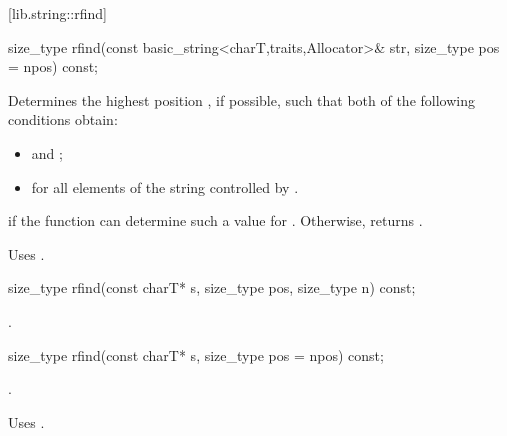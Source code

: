 [lib.string::rfind]{}

%
%
\begin{itemdecl}
size_type rfind(const basic_string<charT,traits,Allocator>& str,
                size_type pos = npos) const;
\end{itemdecl}

\begin{itemdescr}
\pnum
\effects
Determines the highest position , if possible, such that both of
the following conditions obtain:

\begin{itemize}
\item
{}
and
;
\item
{}%
for all elements  of the string controlled by .
\end{itemize}

\pnum
\returns
{} if the function can determine such a value for .
Otherwise, returns
.

\pnum
\notes
Uses
.
\end{itemdescr}

%
%
\begin{itemdecl}
size_type rfind(const charT* s, size_type pos, size_type n) const;
\end{itemdecl}

\begin{itemdescr}
\pnum
\returns
{}.
\end{itemdescr}

%
%
\begin{itemdecl}
size_type rfind(const charT* s, size_type pos = npos) const;
\end{itemdecl}

\begin{itemdescr}
\pnum
\returns
{}.

\pnum
\notes
Uses .
\end{itemdescr}

